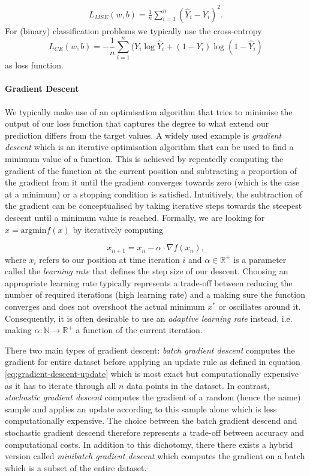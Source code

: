 \begin{align} 
L_{MSE}(w,b) = \frac{1}{n} \sum_{i=1}^{n}(\hat{Y}_i - Y_i)^2.
\end{align} 
For (binary) classification problems we typically use the cross-entropy
\begin{equation}
	L_{CE}(w,b) = - \frac{1}{n} \sum_{i=1}^{n} (Y_i \log \hat{Y}_i + (1 - Y_i) \log 
	(1- \hat{Y}_i)
\end{equation}
as loss function. 

\paragraph{Gradient Descent} We typically make use of an optimisation algorithm that tries to minimise the output of our loss function that captures the degree to what extend our prediction differs from the target values. A widely used example is \emph{gradient descent} which is an iterative optimisation algorithm that can be used to find a minimum value of a function. This is achieved by repeatedly computing the gradient of the function at the current position and subtracting a proportion of the gradient from it until the gradient converges towards zero (which is the case at a minimum) or a stopping condition is satisfied. Intuitively, the subtraction of the gradient can be conceptualised by taking iterative steps towards the steepest descent until a minimum value is reached. 
Formally, we are looking for $x = \text{argmin} f(x)$ by iteratively computing

\begin{equation}	
	\label{eq:gradient-descent-update}
	x_{n+1} = x_n - \alpha \cdot \nabla f(x_n),
\end{equation}
where $x_i$ refers to our position at time iteration $i$ and $\alpha \in \mathbb{R}^+$ is a parameter called the \emph{learning rate} that defines the step size of our descent. Choosing an appropriate learning rate typically represents a trade-off between reducing the number of required iterations (high learning rate) and a making sure the function converges and does not overshoot the actual minimum $x^*$ or oscillates around it. Consequently, it is often desirable to use an \emph{adaptive learning rate} instead, i.e. making $\alpha: \mathbb{N} \rightarrow \mathbb{R}^+$ a function of the current iteration. 

There two main types of gradient descent: \emph{batch gradient descent} computes the gradient for entire dataset before applying an update rule as defined in equation \ref{eq:gradient-descent-update} which is most exact but computationally expensive as it has to iterate through all $n$ data points in the dataset. In contrast, \emph{stochastic gradient descent} computes the gradient of a random (hence the name) sample and applies an update according to this sample alone which is less computationally expensive. The choice between the batch gradient descend and stochastic gradient descend therefore represents a trade-off between accuracy and computational costs. In addition to this dichotomy, there there exists a hybrid version called \emph{minibatch gradient descent} which computes the gradient on a batch which is a subset of the entire dataset. 

